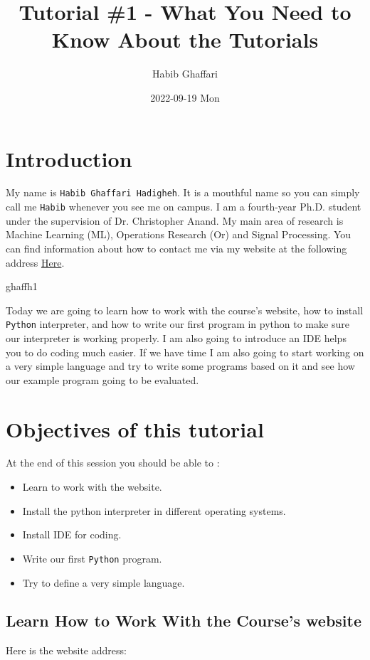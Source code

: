 \documentclass[11pt]{article}
\author{Habib Ghaffari}
\date{2022-09-19 Mon}
\title{Tutorial \#1 - What You Need to Know About the Tutorials}
\begin{document}
\maketitle
\tableofcontents




\section{Introduction}
\label{sec:org977a8da}

My name is \texttt{Habib Ghaffari Hadigheh}. It is a mouthful name so you can simply
call me \texttt{Habib} whenever you see me on campus. I am a fourth-year Ph.D.
student under the supervision of Dr. Christopher Anand. My main area of
research is Machine Learning (ML), Operations Research (Or) and Signal
Processing. You can find information about how to contact me via my website at
the following address \href{https://ghhabib.me}{Here}.

ghaffh1

Today we are going to learn how to work with the course's website, how to
install \texttt{Python} interpreter, and how to write our first program in python to
make sure our interpreter is working properly. I am also going to introduce an
IDE helps you to do coding much easier. If we have time I am also
going to start working on a very simple language and try to write some
programs based on it and see how our example program going to be evaluated.

\section{Objectives of this tutorial}
\label{sec:orga2bcc62}

At the end of this session you should be able to :

\begin{itemize}
\item Learn to work with the website.
\item Install the python interpreter in different operating systems.
\item Install IDE for coding.
\item Write our first \texttt{Python} program.
\item Try to define a very simple language.
\end{itemize}

\subsection{Learn How to Work With the Course's website}
\label{cp2:s1}
Here is the website address:
\end{document}
